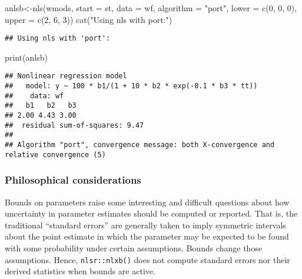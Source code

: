 \documentclass[
]{article}
\newenvironment{Shaded}{\begin{snugshade}}{\end{snugshade}}
\newcommand{\AttributeTok}[1]{\textcolor[rgb]{0.77,0.63,0.00}{#1}}
\newcommand{\DecValTok}[1]{\textcolor[rgb]{0.00,0.00,0.81}{#1}}
\newcommand{\FunctionTok}[1]{\textcolor[rgb]{0.00,0.00,0.00}{#1}}
\newcommand{\NormalTok}[1]{#1}
\newcommand{\OtherTok}[1]{\textcolor[rgb]{0.56,0.35,0.01}{#1}}
\newcommand{\StringTok}[1]{\textcolor[rgb]{0.31,0.60,0.02}{#1}}
\begin{document}
\begin{Shaded}
\begin{Highlighting}[]
\NormalTok{anlsb}\OtherTok{\textless{}{-}}\FunctionTok{nls}\NormalTok{(wmods, }\AttributeTok{start =}\NormalTok{ st, }\AttributeTok{data =}\NormalTok{ wf, }\AttributeTok{algorithm =} \StringTok{"port"}\NormalTok{, }
           \AttributeTok{lower =} \FunctionTok{c}\NormalTok{(}\DecValTok{0}\NormalTok{, }\DecValTok{0}\NormalTok{, }\DecValTok{0}\NormalTok{), }\AttributeTok{upper =} \FunctionTok{c}\NormalTok{(}\DecValTok{2}\NormalTok{, }\DecValTok{6}\NormalTok{, }\DecValTok{3}\NormalTok{))}
\FunctionTok{cat}\NormalTok{(}\StringTok{"Using nls with \textquotesingle{}port\textquotesingle{}:"}\NormalTok{)}
\end{Highlighting}
\end{Shaded}

\begin{verbatim}
## Using nls with 'port':
\end{verbatim}

\begin{Shaded}
\begin{Highlighting}[]
\FunctionTok{print}\NormalTok{(anlsb)}
\end{Highlighting}
\end{Shaded}

\begin{verbatim}
## Nonlinear regression model
##   model: y ~ 100 * b1/(1 + 10 * b2 * exp(-0.1 * b3 * tt))
##    data: wf
##   b1   b2   b3 
## 2.00 4.43 3.00 
##  residual sum-of-squares: 9.47
## 
## Algorithm "port", convergence message: both X-convergence and relative convergence (5)
\end{verbatim}

\hypertarget{philosophical-considerations}{%
\subsubsection{Philosophical
considerations}\label{philosophical-considerations}}

Bounds on parameters raise some interesting and difficult questions
about how uncertainty in parameter estimates should be computed or
reported. That is, the traditional ``standard errors'' are generally
taken to imply symmetric intervals about the point estimate in which the
parameter may be expected to be found with some probability under
certain assumptions. Bounds change those assumptions. Hence,
\texttt{nlsr::nlxb()} does not compute standard errors nor their derived
statistics when bounds are active.
\end{document}
